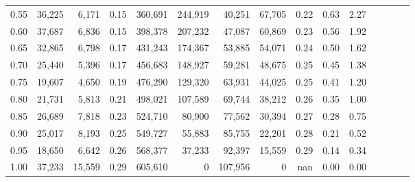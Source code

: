 \begin{tabular}{rrrcrrrrrrrrrrr}
0.55 &  36,225 &   6,171 &                                       0.15 &  360,691 &  244,919 &   40,251 &   67,705 &  0.22 &  0.63 &                         2.27 \\
0.60 &  37,687 &   6,836 &                                       0.15 &  398,378 &  207,232 &   47,087 &   60,869 &  0.23 &  0.56 &                         1.92 \\
0.65 &  32,865 &   6,798 &                                       0.17 &  431,243 &  174,367 &   53,885 &   54,071 &  0.24 &  0.50 &                         1.62 \\
0.70 &  25,440 &   5,396 &                                       0.17 &  456,683 &  148,927 &   59,281 &   48,675 &  0.25 &  0.45 &                         1.38 \\
0.75 &  19,607 &   4,650 &                                       0.19 &  476,290 &  129,320 &   63,931 &   44,025 &  0.25 &  0.41 &                         1.20 \\
0.80 &  21,731 &   5,813 &                                       0.21 &  498,021 &  107,589 &   69,744 &   38,212 &  0.26 &  0.35 &                         1.00 \\
0.85 &  26,689 &   7,818 &                                       0.23 &  524,710 &   80,900 &   77,562 &   30,394 &  0.27 &  0.28 &                         0.75 \\
0.90 &  25,017 &   8,193 &                                       0.25 &  549,727 &   55,883 &   85,755 &   22,201 &  0.28 &  0.21 &                         0.52 \\
0.95 &  18,650 &   6,642 &                                       0.26 &  568,377 &   37,233 &   92,397 &   15,559 &  0.29 &  0.14 &                         0.34 \\
1.00 &  37,233 &  15,559 &                                       0.29 &  605,610 &        0 &  107,956 &        0 &   nan &  0.00 &                         0.00 \\
\bottomrule
\end{tabular}
